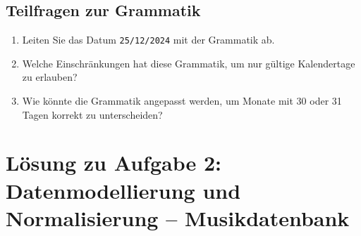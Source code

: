 \documentclass[a4paper,12pt]{article}
\begin{document}
	\subsection*{Teilfragen zur Grammatik}
	\begin{enumerate}
		\item Leiten Sie das Datum \texttt{25/12/2024} mit der Grammatik ab.
		\item Welche Einschränkungen hat diese Grammatik, um nur gültige Kalendertage zu erlauben?
		\item Wie könnte die Grammatik angepasst werden, um Monate mit 30 oder 31 Tagen korrekt zu unterscheiden?
	\end{enumerate}
	
	\section*{Lösung zu Aufgabe 2: Datenmodellierung und Normalisierung – Musikdatenbank}
	
\end{document}
